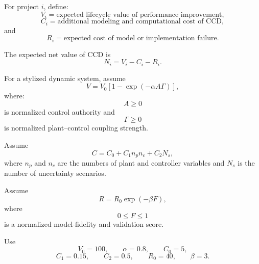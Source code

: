 For project $i$, define:
\begin{equation}
V_i
=
\text{expected lifecycle value of performance improvement},
\end{equation}
\begin{equation}
C_i
=
\text{additional modeling and computational cost of CCD},
\end{equation}
and
\begin{equation}
R_i
=
\text{expected cost of model or implementation failure}.
\end{equation}

The expected net value of CCD is
\begin{equation}
N_i
=
V_i-C_i-R_i.
\end{equation}

For a stylized dynamic system, assume
\begin{equation}
V
=
V_0
\left[
1-
\exp
\left(
-\alpha A\Gamma
\right)
\right],
\end{equation}
where:
\begin{equation}
A\geq0
\end{equation}
is normalized control authority and
\begin{equation}
\Gamma\geq0
\end{equation}
is normalized plant--control coupling strength.

Assume
\begin{equation}
C
=
C_0+C_1n_pn_c+C_2N_s,
\end{equation}
where $n_p$ and $n_c$ are the numbers of plant and controller variables and
$N_s$ is the number of uncertainty scenarios.

Assume
\begin{equation}
R
=
R_0
\exp
\left(
-\beta F
\right),
\end{equation}
where
\begin{equation}
0\leq F\leq1
\end{equation}
is a normalized model-fidelity and validation score.

Use
\begin{equation}
V_0=100,
\qquad
\alpha=0.8,
\qquad
C_0=5,
\end{equation}
\begin{equation}
C_1=0.15,
\qquad
C_2=0.5,
\qquad
R_0=40,
\qquad
\beta=3.
\end{equation}

